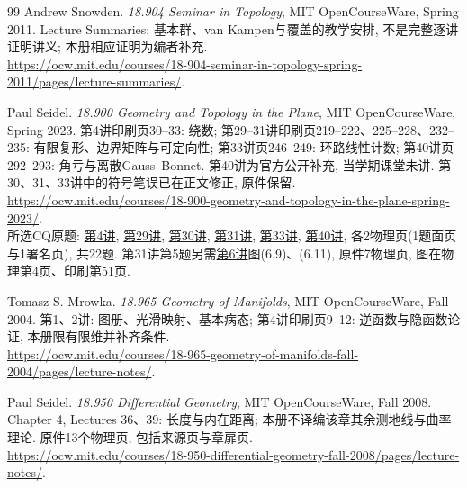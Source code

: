 \begin{thebibliography}{99}
Andrew Snowden. \textit{18.904 Seminar in Topology}, MIT OpenCourseWare, Spring 2011. Lecture Summaries: 基本群、van Kampen与覆盖的教学安排, 不是完整逐讲证明讲义; 本册相应证明为编者补充.\\
\url{https://ocw.mit.edu/courses/18-904-seminar-in-topology-spring-2011/pages/lecture-summaries/}.

Paul Seidel. \textit{18.900 Geometry and Topology in the Plane}, MIT OpenCourseWare, Spring 2023. 第4讲印刷页30--33: 绕数; 第29--31讲印刷页219--222、225--228、232--235: 有限复形、边界矩阵与可定向性; 第33讲页246--249: 环路线性计数; 第40讲页292--293: 角亏与离散Gauss--Bonnet. 第40讲为官方公开补充, 当学期课堂未讲. 第30、31、33讲中的符号笔误已在正文修正, 原件保留.\\
\url{https://ocw.mit.edu/courses/18-900-geometry-and-topology-in-the-plane-spring-2023/}.\\
所选CQ原题: \href{https://ocw.mit.edu/courses/18-900-geometry-and-topology-in-the-plane-spring-2023/mit18_900s23_q4.pdf}{第4讲}, \href{https://ocw.mit.edu/courses/18-900-geometry-and-topology-in-the-plane-spring-2023/mit18_900s23_q29.pdf}{第29讲}, \href{https://ocw.mit.edu/courses/18-900-geometry-and-topology-in-the-plane-spring-2023/mit18_900s23_q30.pdf}{第30讲}, \href{https://ocw.mit.edu/courses/18-900-geometry-and-topology-in-the-plane-spring-2023/mit18_900s23_q31.pdf}{第31讲}, \href{https://ocw.mit.edu/courses/18-900-geometry-and-topology-in-the-plane-spring-2023/mit18_900s23_q33.pdf}{第33讲}, \href{https://ocw.mit.edu/courses/18-900-geometry-and-topology-in-the-plane-spring-2023/mit18_900s23_q40.pdf}{第40讲}, 各2物理页(1题面页与1署名页), 共22题. 第31讲第5题另需\href{https://ocw.mit.edu/courses/18-900-geometry-and-topology-in-the-plane-spring-2023/mit18_900s23_lec6.pdf}{第6讲}图(6.9)、(6.11), 原件7物理页, 图在物理第4页、印刷第51页.

Tomasz S. Mrowka. \textit{18.965 Geometry of Manifolds}, MIT OpenCourseWare, Fall 2004. 第1、2讲: 图册、光滑映射、基本病态; 第4讲印刷页9--12: 逆函数与隐函数论证, 本册限有限维并补齐条件.\\
\url{https://ocw.mit.edu/courses/18-965-geometry-of-manifolds-fall-2004/pages/lecture-notes/}.

Paul Seidel. \textit{18.950 Differential Geometry}, MIT OpenCourseWare, Fall 2008. Chapter 4, Lectures 36、39: 长度与内在距离; 本册不译编该章其余测地线与曲率理论. 原件13个物理页, 包括来源页与章扉页.\\
\url{https://ocw.mit.edu/courses/18-950-differential-geometry-fall-2008/pages/lecture-notes/}.


\end{thebibliography}
